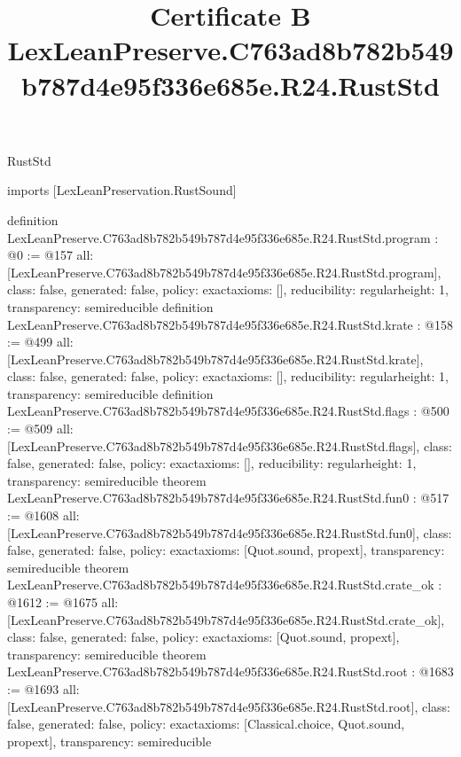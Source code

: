 \begin{lexlean}{RustStd}
\title{Certificate B LexLeanPreserve.C763ad8b782b549b787d4e95f336e685e.R24.RustStd}
\begin{coremodule}
imports [LexLeanPreservation.RustSound]

definition LexLeanPreserve.C763ad8b782b549b787d4e95f336e685e.R24.RustStd.program : @0 := @157 {
  all: [LexLeanPreserve.C763ad8b782b549b787d4e95f336e685e.R24.RustStd.program],
  class: false,
  generated: false,
  policy: exact{axioms: []},
  reducibility: regular{height: 1},
  transparency: semireducible
}
definition LexLeanPreserve.C763ad8b782b549b787d4e95f336e685e.R24.RustStd.krate : @158 := @499 {
  all: [LexLeanPreserve.C763ad8b782b549b787d4e95f336e685e.R24.RustStd.krate],
  class: false,
  generated: false,
  policy: exact{axioms: []},
  reducibility: regular{height: 1},
  transparency: semireducible
}
definition LexLeanPreserve.C763ad8b782b549b787d4e95f336e685e.R24.RustStd.flags : @500 := @509 {
  all: [LexLeanPreserve.C763ad8b782b549b787d4e95f336e685e.R24.RustStd.flags],
  class: false,
  generated: false,
  policy: exact{axioms: []},
  reducibility: regular{height: 1},
  transparency: semireducible
}
theorem LexLeanPreserve.C763ad8b782b549b787d4e95f336e685e.R24.RustStd.fun0 : @517 := @1608 {
  all: [LexLeanPreserve.C763ad8b782b549b787d4e95f336e685e.R24.RustStd.fun0],
  class: false,
  generated: false,
  policy: exact{axioms: [Quot.sound, propext]},
  transparency: semireducible
}
theorem LexLeanPreserve.C763ad8b782b549b787d4e95f336e685e.R24.RustStd.crate_ok : @1612 := @1675 {
  all: [LexLeanPreserve.C763ad8b782b549b787d4e95f336e685e.R24.RustStd.crate_ok],
  class: false,
  generated: false,
  policy: exact{axioms: [Quot.sound, propext]},
  transparency: semireducible
}
theorem LexLeanPreserve.C763ad8b782b549b787d4e95f336e685e.R24.RustStd.root : @1683 := @1693 {
  all: [LexLeanPreserve.C763ad8b782b549b787d4e95f336e685e.R24.RustStd.root],
  class: false,
  generated: false,
  policy: exact{axioms: [Classical.choice, Quot.sound, propext]},
  transparency: semireducible
}


\end{coremodule}
\end{lexlean}

